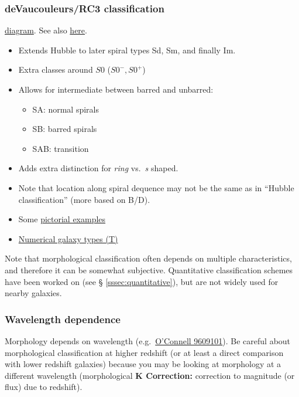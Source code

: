 \documentclass{article}
\newcommand{\myref}[1]{\textcolor{pinegreen}{\S{} \ref{#1}}}
\begin{document}
\subsubsection{deVaucouleurs/RC3 classification}
\href{http://astronomy.nmsu.edu/holtz/a555/html/diagrams/a616/rc3class.htm}
{diagram}.
See also \href{http://astronomy.as.virginia.edu}{here}.
\begin{itemize}
    \item Extends Hubble to later spiral types Sd, Sm, and finally Im.
    \item Extra classes around $S0$ ($S0^{-}, S0^{+}$)
    \item Allows for intermediate between barred and unbarred:
        \begin{itemize}
            \item SA: normal spirals
            \item SB: barred spirals
            \item SAB: transition
        \end{itemize}
    \item Adds extra distinction for \emph{ring} vs.\ \emph{s} shaped.
    \item Note that location along spiral dequence may not be the same as in
        ``Hubble classification'' (more based on B/D).
    \item Some \href{http://astronomy.as.virginia.edu}
        {{pictorial examples}}
    \item \href{http://astronomy.nmsu.edu/holtz/a555/html/diagrams/a616/numtype.htm}
        {{Numerical galaxy types (T)}}
\end{itemize}
Note that morphological classification often depends on multiple
characteristics, and therefore it can be somewhat subjective.
Quantitative classification schemes have been worked on
(see \myref{sssec:quantitative}),
but are not widely used
for nearby galaxies.

\subsubsection{Wavelength dependence}
Morphology depends on wavelength
(e.g.\ \href{http://ned.ipac.caltech.edu/level5/Kuchinski/frames.html}
{O'Connell 9609101}).
Be careful about morphological classification at higher redshift
(or at least a direct comparison with lower redshift galaxies)
because you may be looking at morphology at a different wavelength
(morphological \textbf{K Correction:} correction to magnitude (or flux) due
to redshift).
\end{document}
